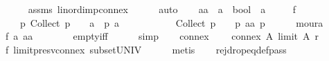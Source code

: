 \begin{isabellebody}
\ \ \ \ \isamarkupfalse%
\ assms\ lin{\isacharunderscore}{\kern0pt}ord{\isacharunderscore}{\kern0pt}imp{\isacharunderscore}{\kern0pt}connex\isanewline
\ \ \ \ \isamarkupfalse%
\ auto\isanewline
\ \ \isamarkupfalse%
\ aa\ {\isacharcolon}{\kern0pt}{\isacharcolon}{\kern0pt}\ {\isachardoublequoteopen}{\isacharparenleft}{\kern0pt}{\isacharprime}{\kern0pt}a\ {\isasymRightarrow}\ bool{\isacharparenright}{\kern0pt}\ {\isasymRightarrow}\ {\isacharprime}{\kern0pt}a{\isachardoublequoteclose}\ \isanewline
\ \ \ \ f{}{\isacharcolon}{\kern0pt}\isanewline
\ \ \ \ {\isachardoublequoteopen}{\isasymforall}p{\isachardot}{\kern0pt}\ {\isacharparenleft}{\kern0pt}Collect\ p\ {\isacharequal}{\kern0pt}\ {\isacharbraceleft}{\kern0pt}{\isacharbraceright}{\kern0pt}\ {\isasymlongrightarrow}\ {\isacharparenleft}{\kern0pt}{\isasymforall}a{\isachardot}{\kern0pt}\ {\isasymnot}\ p\ a{\isacharparenright}{\kern0pt}{\isacharparenright}{\kern0pt}\ {\isasymand}\isanewline
\ \ \ \ \ \ \ \ \ \ {\isacharparenleft}{\kern0pt}Collect\ p\ {\isasymnoteq}\ {\isacharbraceleft}{\kern0pt}{\isacharbraceright}{\kern0pt}\ {\isasymlongrightarrow}\ p\ {\isacharparenleft}{\kern0pt}aa\ p{\isacharparenright}{\kern0pt}{\isacharparenright}{\kern0pt}{\isachardoublequoteclose}\isanewline
\ \ \ \ \isamarkupfalse%
\ moura\isanewline
\ \ \isamarkupfalse%
\ f{}{\isacharcolon}{\kern0pt}\ {\isachardoublequoteopen}{\isasymforall}a{\isachardot}{\kern0pt}\ {\isacharparenleft}{\kern0pt}a{\isacharcolon}{\kern0pt}{\isacharcolon}{\kern0pt}{\isacharprime}{\kern0pt}a{\isacharparenright}{\kern0pt}\ {\isasymnotin}\ {\isacharbraceleft}{\kern0pt}{\isacharbraceright}{\kern0pt}{\isachardoublequoteclose}\isanewline
\ \ \ \ \isamarkupfalse%
\ empty{\isacharunderscore}{\kern0pt}iff\isanewline
\ \ \ \ \isamarkupfalse%
\ simp\isanewline
\ \ \isamarkupfalse%
\ connex{\isacharcolon}{\kern0pt}\isanewline
\ \ \ \ {\isachardoublequoteopen}connex\ A\ {\isacharparenleft}{\kern0pt}limit\ A\ r{\isacharparenright}{\kern0pt}{\isachardoublequoteclose}\isanewline
\ \ \ \ \isamarkupfalse%
\ f{}\ limit{\isacharunderscore}{\kern0pt}presv{\isacharunderscore}{\kern0pt}connex\ subset{\isacharunderscore}{\kern0pt}UNIV\isanewline
\ \ \ \ \isamarkupfalse%
\ metis\isanewline
\ \ \isamarkupfalse%
\ rej{\isacharunderscore}{\kern0pt}drop{\isacharunderscore}{\kern0pt}eq{\isacharunderscore}{\kern0pt}def{\isacharunderscore}{\kern0pt}pass{\isacharcolon}{\kern0pt}\isanewline

\end{isabellebody}
